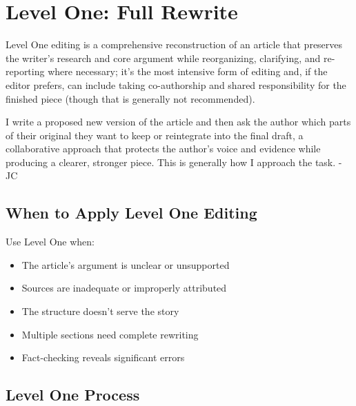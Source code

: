 \documentclass[12pt]{article}
\begin{document}
\newpage

\section{Level One: Full Rewrite}
\label{sec:level-one}

Level One editing is a comprehensive reconstruction of an article that preserves the writer’s research and core argument while reorganizing, clarifying, and re-reporting where necessary; it’s the most intensive form of editing and, if the editor prefers, can include taking co-authorship and shared responsibility for the finished piece (though that is generally not recommended). 

I write a proposed new version of the article and then ask the author which parts of their original they want to keep or reintegrate into the final draft, a collaborative approach that protects the author’s voice and evidence while producing a clearer, stronger piece. This is generally how I approach the task. -JC

\subsection{When to Apply Level One Editing}

Use Level One when:
\begin{itemize}
    \item The article's argument is unclear or unsupported
    \item Sources are inadequate or improperly attributed
    \item The structure doesn't serve the story
    \item Multiple sections need complete rewriting
    \item Fact-checking reveals significant errors
\end{itemize}

\subsection{Level One Process}
\begin{center}
\end{center}
\end{document}
